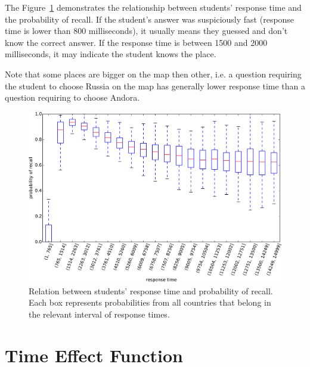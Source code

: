 The Figure~\ref{fig-response-time} demonstrates the relationship between students' response time and the probability of recall. If the student's answer was suspiciously fast (response time is lower than 800 milliseconds), it usually means they guessed and don't know the correct answer. If the response time is between 1500 and 2000 milliseconds, it may indicate the student knows the place.

Note that some places are bigger on the map then other, i.e. a question requiring the student to choose Russia on the map has generally lower response time than a question requiring to choose Andora.

\begin{figure}[htbp]
  \centering
  \includegraphics[width=\textwidth]{img/response-time}
  \caption{Relation between students' response time and probability of recall. Each box represents probabilities from all countries that belong in the relevant interval of response times.}
  \label{fig-response-time}
\end{figure}

\section{Time Effect Function}

